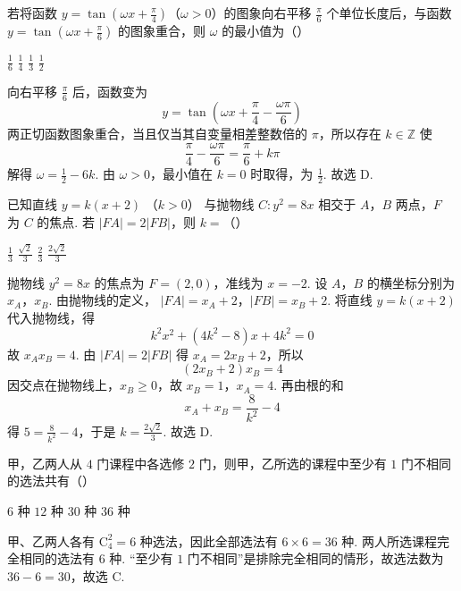 \begin{problem}
若将函数 \( y = \tan \left( \omega x + \frac{\pi}{4} \right) \)（\(\omega > 0\)）的图象向右平移 \( \frac{\pi}{6}\text{ 个单位长度} \)后，与函数 \( y = \tan \left( \omega x + \frac{\pi}{6} \right) \) 的图象重合，则 \( \omega \) 的最小值为（\quad）

\choices
    {\(\frac{1}{6}\)}
    {\(\frac{1}{4}\)}
    {\( \frac{1}{3} \)}
    {\(\frac{1}{2}\)}

\begin{solution}
向右平移 \(\frac{\pi}{6}\) 后，函数变为
\[
y=\tan\left(\omega x+\frac{\pi}{4}-\frac{\omega\pi}{6}\right)
\]
两正切函数图象重合，当且仅当其自变量相差整数倍的 \(\pi\)，所以存在 \(k\in\mathbb Z\) 使
\[
\frac{\pi}{4}-\frac{\omega\pi}{6}=\frac{\pi}{6}+k\pi
\]
解得 \(\omega=\frac12-6k\).
由 \(\omega>0\)，最小值在 \(k=0\) 时取得，为 \(\frac12\). 故选 D.
\end{solution}
\end{problem}

\begin{problem}
已知直线 \( y = k(x + 2) \) （\( k > 0 \)） 与抛物线 \( C: y^2 = 8x \) 相交于 \(A\)，\(B\) 两点，\(F\) 为 \(C\) 的焦点. 若 \( |FA| = 2|FB| \)，则 \( k = \)（\quad）

\choices
    {\(\frac{1}{3}\)}
    {\(\frac{\sqrt{2}}{3}\)}
    {\( \frac{2}{3} \)}
    {\(\frac{2\sqrt{2}}{3}\)}

\begin{solution}
抛物线 \(y^{2}=8x\) 的焦点为 \(F=(2,0)\)，准线为 \(x=-2\). 设 \(A\)，\(B\) 的横坐标分别为 \(x_{A}\)，\(x_{B}\). 由抛物线的定义，
\(|FA|=x_{A}+2\)，\(|FB|=x_{B}+2\).
将直线 \(y=k(x+2)\) 代入抛物线，得
\[
k^{2}x^{2}+(4k^{2}-8)x+4k^{2}=0
\]
故 \(x_{A}x_{B}=4\). 由 \(|FA|=2|FB|\) 得 \(x_{A}=2x_{B}+2\)，所以
\[
(2x_{B}+2)x_{B}=4
\]
因交点在抛物线上，\(x_{B}\geqslant0\)，故 \(x_{B}=1\)，\(x_{A}=4\). 再由根的和
\[
x_{A}+x_{B}=\frac{8}{k^{2}}-4
\]
得 \(5=\frac{8}{k^{2}}-4\)，于是 \(k=\frac{2\sqrt2}{3}\). 故选 D.
\end{solution}
\end{problem}

\begin{problem}
甲，乙两人从 \(4\text{ 门}\)课程中各选修 \(2\text{ 门}\)，则甲，乙所选的课程中至少有 \(1\text{ 门}\)不相同的选法共有（\quad）

\choices
    {\(6\text{ 种}\)}
    {\(12\text{ 种}\)}
    {\(30\text{ 种}\)}
    {\(36\text{ 种}\)}

\begin{solution}
甲、乙两人各有 \(\mathrm C_4^2=6\) 种选法，因此全部选法有 \(6\times6=36\) 种. 两人所选课程完全相同的选法有 \(6\) 种. “至少有 \(1\) 门不相同”是排除完全相同的情形，故选法数为 \(36-6=30\)，故选 C.
\end{solution}
\end{problem}

